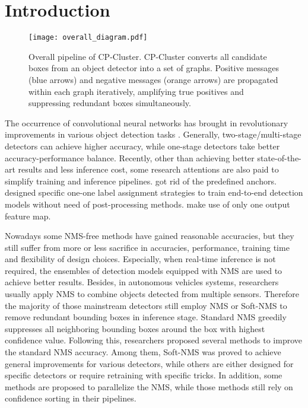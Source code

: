 \documentclass[10pt,twocolumn,letterpaper]{article}
\begin{document}
\section{Introduction}
\label{sec:intro}
\begin{figure*}[h!]
  \centering
  \texttt{[image: overall\_diagram.pdf]}
  \caption{Overall pipeline of CP-Cluster. CP-Cluster converts all candidate boxes from an object detector into a set of graphs. Positive messages (blue arrows) and negative messages (orange arrows) are propagated within each graph iteratively, amplifying true positives and suppressing redundant boxes simultaneously.}
  \label{fig:cp_overall_diagram}
\end{figure*}
The occurrence of convolutional neural networks has brought in revolutionary improvements in various object detection tasks \cite{lin2014microsoft,everingham2015pascal,gupta2019lvis,xia2018dota}.
Generally, two-stage/multi-stage detectors\cite{ren2015faster,dai2016r,cai2018cascade,he2017mask,zhou2021probabilistic} can achieve higher accuracy, while one-stage detectors\cite{liu2016ssd,he2015spatial,lin2017focal,redmon2018yolov3,bochkovskiy2020yolov4,wang2021scaled,21yolov5} take better accuracy-performance balance.
Recently, other than achieving better state-of-the-art results and less inference cost, some research attentions are also paid to simplify training and inference pipelines. \cite{tian2019fcos,law2018cornernet,zhou2019objects,zhang2020bridging} got rid of the predefined anchors. \cite{zhou2019objects, carion2020end, zhu2020deformable, peize2020onenet, wang2021end} designed specific one-one label assignment strategies to train end-to-end detection models without need of post-processing methods.
\cite{chen2021you,zhou2019objects} make use of only one output feature map.

Nowadays some NMS-free methods have gained reasonable accuracies, but they still suffer from more or less sacrifice in accuracies, performance, training time and flexibility of design choices.
Especially, when real-time inference is not required, the ensembles of detection models equipped with NMS are used to achieve better results\cite{zhu2021tph,solovyev2021weighted}. Besides, in autonomous vehicles systems, researchers usually apply NMS to combine objects detected from multiple sensors.
Therefore the majority of those mainstream detectors\cite{21yolov5,lin2017focal,tian2019fcos,ren2015faster} still employ NMS or Soft-NMS\cite{bodla2017soft} to remove redundant bounding boxes in inference stage.
Standard NMS greedily suppresses all neighboring bounding boxes around the box with highest confidence value. Following this, researchers proposed several methods to improve the standard NMS accuracy\cite{bodla2017soft,liu2019adaptive,jiang2018acquisition,zhou2017cad}. Among them, Soft-NMS\cite{bodla2017soft} was proved to achieve general improvements for various detectors, while others are either designed for specific detectors or require retraining with specific tricks.
In addition, some methods are proposed to parallelize the NMS\cite{zheng2021enhancing,bolya2019yolact}, while those methods still rely on confidence sorting in their pipelines.
\end{document}
